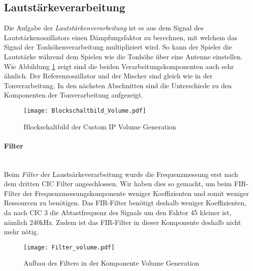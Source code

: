 \subsection{Lautstärkeverarbeitung}\label{subsec:Volume_Generation}
Die Aufgabe der \textit{Lautstärkenverarbeitung} ist es aus dem Signal des Lautstärkenoszillators einen Dämpfungsfaktor zu berechnen, mit welchem das Signal der Tonhöhenverarbeitung multipliziert wird. So kann der Spieler die Lautstärke während dem Spielen wie die Tonhöhe über eine Antenne einstellen. Wie Abbildung \ref{img:Blockschaltbild_volume} zeigt sind die beiden Verarbeitungskomponenten auch sehr ähnlich. Der Referenzoszillator und der Mischer sind gleich wie in der Tonverarbeitung. In den nächsten Abschnitten sind die Unterschiede zu den Komponenten der Tonverarbeitung aufgezeigt.



\begin{figure}[h!]
	\centering
	\texttt{[image: Blockschaltbild\_Volume.pdf]}
	\caption{Blockschaltbild der Custom IP Volume Generation} 
	\label{img:Blockschaltbild_volume}
\end{figure}  

\paragraph{Filter}\mbox{}\\
Beim \textit{Filter} der Laustsärkeverarbeitung wurde die Frequenzmessung erst nach dem dritten CIC Filter angeschlossen. Wir haben dies so gemacht, um beim FIR-Filter der Frequenzmessungskomponente weniger Koeffizienten und somit weniger Ressourcen zu benötigen. Das FIR-Filter benötigt deshalb weniger Koeffizienten, da nach CIC 3 die Abtastfrequenz des Signals um den Faktor 45 kleiner ist, nämlich 240kHz. Zudem ist das FIR-Filter in dieser Komponente deshalb nicht mehr nötig.

\begin{figure}[h!]
	\centering
	\texttt{[image: Filter\_volume.pdf]}
	\caption{Aufbau des Filters in der Komponente Volume Generation} 
	\label{img:Filter_Volume}
\end{figure}  

